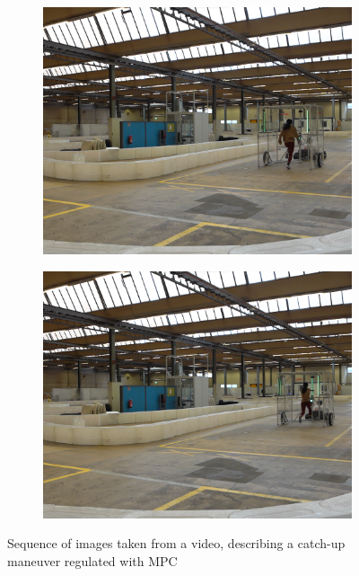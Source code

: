 \documentclass[a4paper,12pt,oneside]{book}
\begin{document}
\begin{figure}[h!]
\begin{subfigure}[b]{0.24\textwidth}
        \includegraphics[width=\textwidth]{Catch/Catch7.png}
    \end{subfigure}
\hfill
    \begin{subfigure}[b]{0.24\textwidth}
        \includegraphics[width=\textwidth]{Catch/Catch8.png}
    \end{subfigure}
    \caption{Sequence of images taken from a video, describing a catch-up maneuver regulated with MPC }
\end{figure}
\end{document}

